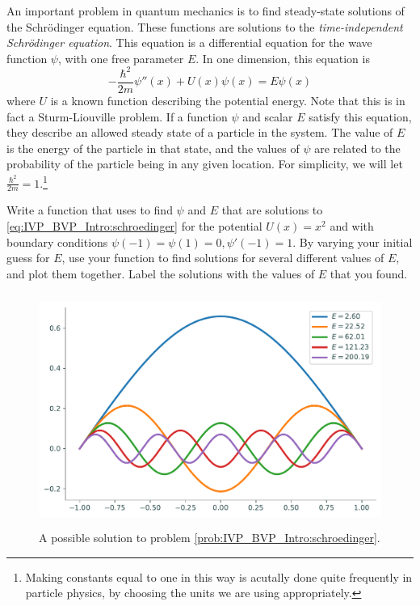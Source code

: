 \begin{problem}
\label{prob:IVP_BVP_Intro:schroedinger}
An important problem in quantum mechanics is to find steady-state solutions of the Schr\"odinger equation.
These functions are solutions to the \textit{time-independent Schr\"odinger equation}.
This equation is a differential equation for the wave function \(\psi\), with one free parameter \(E\).
In one dimension, this equation is
\begin{equation}
\label{eq:IVP_BVP_Intro:schroedinger}
-\frac{\hbar^2}{2m}\psi''(x)+U(x)\psi(x)=E\psi(x)
\end{equation}
where \(U\) is a known function describing the potential energy.
Note that this is in fact a Sturm-Liouville problem.
If a function \(\psi\) and scalar \(E\) satisfy this equation, they describe an allowed steady state of a particle in the system.
The value of \(E\) is the energy of the particle in that state, and the values of \(\psi\) are related to the probability of the particle being in any given location.
For simplicity, we will let \(\frac{\hbar^2}{2m}=1\).\footnote{Making constants equal to one in this way is acutally done quite frequently in particle physics, by choosing the units we are using appropriately.}

Write a function that uses  to find \(\psi\) and \(E\) that are solutions to \eqref{eq:IVP_BVP_Intro:schroedinger} for the potential \(U(x)=x^2\) and with boundary conditions \(\psi(-1)=\psi(1)=0, \psi'(-1)=1\).
By varying your initial guess for \(E\), use your function to find solutions for several different values of \(E\), and plot them together. Label the solutions with the values of \(E\) that you found.
\end{problem}

\begin{figure}[H]
    \label{fig:bvpintro:bvp5}
    \centering
    \includegraphics[height=3in]{figures/problem5.pdf}
    \caption{A possible solution to problem \ref{prob:IVP_BVP_Intro:schroedinger}.}
\end{figure}
